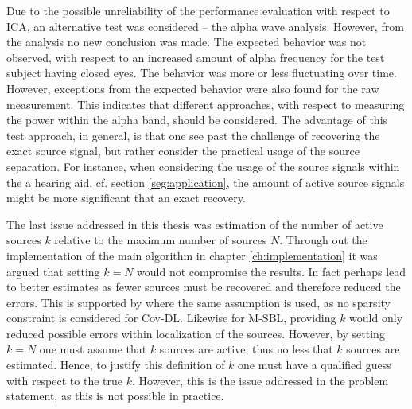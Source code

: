 Due to the possible unreliability of the performance evaluation with respect to ICA, an alternative test was considered -- the alpha wave analysis. 
However, from the analysis no new conclusion was made. The expected behavior was not observed, with respect to an increased amount of alpha frequency for the test subject having closed eyes.
The behavior was more or less fluctuating over time. However, exceptions from the expected behavior were also found for the raw measurement. This indicates that different approaches, with respect to measuring the power within the alpha band, should be considered.
The advantage of this test approach, in general, is that one see past the challenge of recovering the exact source signal, but rather consider the practical usage of the source separation. For instance, when considering the usage of the source signals within the a hearing aid, cf. section \ref{seg:application}, the amount of active source signals might be more significant that an exact recovery.         

The last issue addressed in this thesis was estimation of the number of active sources $k$ relative to the maximum number of sources $N$. Through out the implementation of the main algorithm in chapter \ref{ch:implementation} it was argued that setting $k = N$ would not compromise the results. 
In fact perhaps lead to better estimates as fewer sources must be recovered and therefore reduced the errors.
This is supported by \cite{Balkan2015} where the same assumption is used, as no sparsity constraint is considered for Cov-DL. 
Likewise for M-SBL, providing $k$ would only reduced possible errors within localization of the sources.
However, by setting $k = N$ one must assume that $k$ sources are active, thus no less that $k$ sources are estimated. 
Hence, to justify this definition of $k$ one must have a qualified guess with respect to the true $k$. 
However, this is the issue addressed in the problem statement, as this is not possible in practice.    

